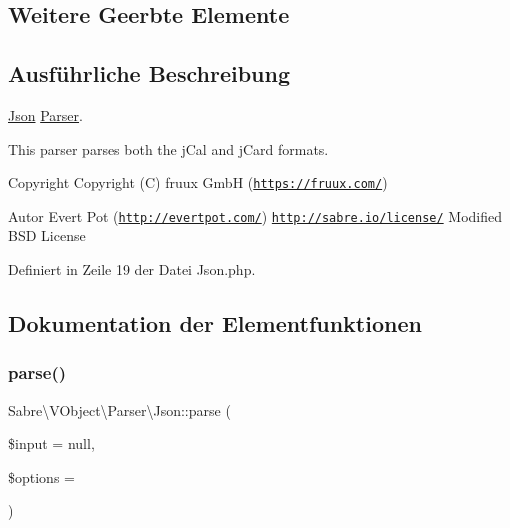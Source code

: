 \subsection*{Weitere Geerbte Elemente}


\subsection{Ausführliche Beschreibung}
\mbox{\hyperlink{class_sabre_1_1_v_object_1_1_parser_1_1_json}{Json}} \mbox{\hyperlink{class_sabre_1_1_v_object_1_1_parser_1_1_parser}{Parser}}.

This parser parses both the j\+Cal and j\+Card formats.

\begin{DoxyCopyright}{Copyright}
Copyright (C) fruux GmbH (\href{https://fruux.com/}{\tt https\+://fruux.\+com/}) 
\end{DoxyCopyright}
\begin{DoxyAuthor}{Autor}
Evert Pot (\href{http://evertpot.com/}{\tt http\+://evertpot.\+com/})  \href{http://sabre.io/license/}{\tt http\+://sabre.\+io/license/} Modified B\+SD License 
\end{DoxyAuthor}


Definiert in Zeile 19 der Datei Json.\+php.



\subsection{Dokumentation der Elementfunktionen}
\mbox{\label{class_sabre_1_1_v_object_1_1_parser_1_1_json_a46c0e88efac1ef03c8bad23b24eda9db}} 
\subsubsection{\texorpdfstring{parse()}{parse()}}
{\footnotesize\ttfamily Sabre\textbackslash{}\+V\+Object\textbackslash{}\+Parser\textbackslash{}\+Json\+::parse (\begin{DoxyParamCaption}\item[{}]{\$input = {\ttfamily null},  }\item[{}]{\$options = {} }\end{DoxyParamCaption})}

